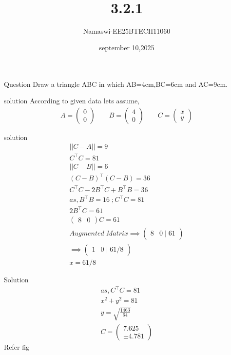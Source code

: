 \documentclass{beamer}
\begin{document}
\title 
{3.2.1}
\date{september 10,2025}


\author 
{Namaswi-EE25BTECH11060}
\frame{\titlepage}
\begin{frame}{Question}
 Draw a triangle ABC in which AB=4cm,BC=6cm and AC=9cm.
\end{frame}
\begin{frame}{solution}
 According to given data lets assume,\\
\begin{align*}
    A=\begin{pmatrix}0\\0\end{pmatrix}\qquad 
B=\begin{pmatrix}4\\0\end{pmatrix}\qquad 
C=\begin{pmatrix}x\\y\end{pmatrix}   
\end{align*}

 
\end{frame}

\begin{frame}{solution}
  \begin{align}
    ||C-A||=9\\
    C^\top C=81\\
    ||C-B||=6\\
    (C-B)^\top (C-B)=36\\
    C^\top C-2 B^\top C +B^\top B=36\\
    as,B^\top B =16 \; ; C^\top C=81\\
    2B^\top C =61\\
    \begin{pmatrix}
        8 & 0
    \end{pmatrix}C=61\\
    Augmented\;Matrix \implies
    \begin{pmatrix}
        8 & 0 \;| \;61
    \end{pmatrix}\\
    \implies
    \begin{pmatrix}
        1 & 0 \;|\; 61/8
    \end{pmatrix}\\
    x=61/8
\end{align}
\end{frame}
\begin{frame}{Solution}
\begin{align}
     as,C^\top C =81\\
    x^2+y^2=81\\
    y=\sqrt{\frac{1463}{64}}\\
    C=\begin{pmatrix}
        7.625\\ \pm4.781
    \end{pmatrix}
\end{align}
Refer fig
\end{frame}
\end{document}
